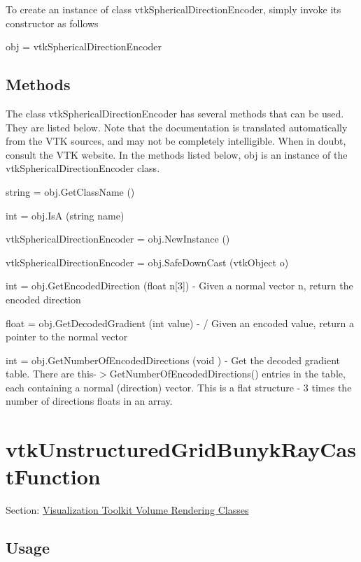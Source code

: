 To create an instance of class vtk\-Spherical\-Direction\-Encoder, simply invoke its constructor as follows \begin{DoxyVerb}  obj = vtkSphericalDirectionEncoder
\end{DoxyVerb}
 \hypertarget{vtkwidgets_vtkxyplotwidget_Methods}{}\subsection{Methods}\label{vtkwidgets_vtkxyplotwidget_Methods}
The class vtk\-Spherical\-Direction\-Encoder has several methods that can be used. They are listed below. Note that the documentation is translated automatically from the V\-T\-K sources, and may not be completely intelligible. When in doubt, consult the V\-T\-K website. In the methods listed below, {\ttfamily obj} is an instance of the vtk\-Spherical\-Direction\-Encoder class. 
\begin{DoxyItemize}
\item {\ttfamily string = obj.\-Get\-Class\-Name ()}  
\item {\ttfamily int = obj.\-Is\-A (string name)}  
\item {\ttfamily vtk\-Spherical\-Direction\-Encoder = obj.\-New\-Instance ()}  
\item {\ttfamily vtk\-Spherical\-Direction\-Encoder = obj.\-Safe\-Down\-Cast (vtk\-Object o)}  
\item {\ttfamily int = obj.\-Get\-Encoded\-Direction (float n\mbox{[}3\mbox{]})} -\/ Given a normal vector n, return the encoded direction  
\item {\ttfamily float = obj.\-Get\-Decoded\-Gradient (int value)} -\/ / Given an encoded value, return a pointer to the normal vector  
\item {\ttfamily int = obj.\-Get\-Number\-Of\-Encoded\-Directions (void )} -\/ Get the decoded gradient table. There are this-\/$>$Get\-Number\-Of\-Encoded\-Directions() entries in the table, each containing a normal (direction) vector. This is a flat structure -\/ 3 times the number of directions floats in an array.  
\end{DoxyItemize}\hypertarget{vtkvolumerendering_vtkunstructuredgridbunykraycastfunction}{}\section{vtk\-Unstructured\-Grid\-Bunyk\-Ray\-Cast\-Function}\label{vtkvolumerendering_vtkunstructuredgridbunykraycastfunction}
Section\-: \hyperlink{sec_vtkvolumerendering}{Visualization Toolkit Volume Rendering Classes} \hypertarget{vtkwidgets_vtkxyplotwidget_Usage}{}\subsection{Usage}\label{vtkwidgets_vtkxyplotwidget_Usage}
